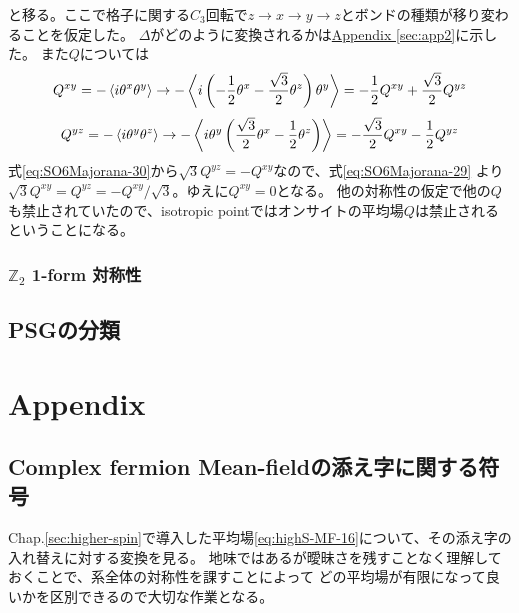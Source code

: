 \documentclass[11pt, aps, longbibliography]{article}
\begin{document}
        と移る。ここで格子に関する$C_3$回転で$z\rightarrow x \rightarrow y \rightarrow z$とボンドの種類が移り変わることを仮定した。
        $\Delta$がどのように変換されるかは\hyperlink{app_Majorana-mf}{Appendix \ref{sec:app2}}に示した。
        また$Q$については
        \begin{equation}\label{eq:SO6Majorana-29}
            Q^{xy} = -\expval{i\theta^x\theta^y} \rightarrow -\expval{i\left( -\frac{1}{2}\theta^x - \frac{\sqrt{3}}{2}\theta^z \right) \theta^y } = -\frac{1}{2}Q^{xy} + \frac{\sqrt{3}}{2}Q^{yz}
        \end{equation}
        \begin{equation}\label{eq:SO6Majorana-30}
            Q^{yz} = -\expval{i\theta^y\theta^z} \rightarrow -\expval{i \theta^y \left( \frac{\sqrt{3}}{2}\theta^x - \frac{1}{2}\theta^z \right)} = -\frac{\sqrt{3}}{2}Q^{xy} - \frac{1}{2}Q^{yz}
        \end{equation}
        式\eqref{eq:SO6Majorana-30}から$\sqrt{3}Q^{yz} = -Q^{xy}$なので、式\eqref{eq:SO6Majorana-29}
        より$\sqrt{3}Q^{xy} = Q^{yz} = -Q^{xy}/\sqrt{3}$。ゆえに$Q^{xy}=0$となる。
        他の対称性の仮定で他の$Q$も禁止されていたので、isotropic pointではオンサイトの平均場$Q$は禁止されるということになる。


        \subsubsection{$\mathbb{Z}_2$ 1-form 対称性}

    \subsection{PSGの分類}

\newpage

\appendix

\section{Appendix}
    \subsection{Complex fermion Mean-fieldの添え字に関する符号}\label{sec:app1}\hypertarget{app_mf1}{}
        Chap.\ref{sec:higher-spin}で導入した平均場\eqref{eq:highS-MF-16}について、その添え字の入れ替えに対する変換を見る。
        地味ではあるが曖昧さを残すことなく理解しておくことで、系全体の対称性を課すことによって
        どの平均場が有限になって良いかを区別できるので大切な作業となる。
        
\end{document}
